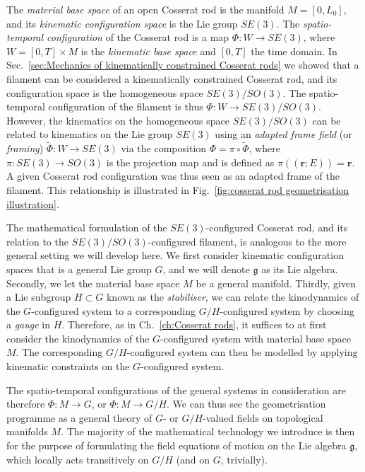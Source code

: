 The \textit{material base space} of an open Cosserat rod is the manifold $M = [0, L_0]$, and its \textit{kinematic configuration space} is the Lie group $SE(3)$. The \textit{spatio-temporal configuration} of the Cosserat rod is a map $\Phi : W \to SE(3)$, where $W = [0,T] \times M$ is the \textit{kinematic base space} and $[0,T]$ the time domain. In Sec.~\ref{sec:Mechanics of kinematically constrained Cosserat rods} we showed that a filament can be considered a kinematically constrained Cosserat rod, and its configuration space is the homogeneous space $SE(3)/SO(3)$. The spatio-temporal configuration of the filament is thus $\Phi : W \to SE(3) / SO(3)$. However, the kinematics on the homogeneous space $SE(3) / SO(3)$ can be related to kinematics on the Lie group $SE(3)$ using an \textit{adapted frame field} (or \textit{framing}) $\tilde{\Phi} : W \to SE(3)$ via the composition $\Phi = \pi \circ \tilde{\Phi}$, where $\pi : SE(3) \to SO(3)$ is the projection map and is defined as $\pi((\mathbf{r} ; E)) = \mathbf{r}$. A given Cosserat rod configuration was thus seen as an adapted frame of the filament. This relationship is illustrated in Fig.~\ref{fig:cosserat rod geometrisation illustration}.

The mathematical formulation of the $SE(3)$-configured Cosserat rod, and its relation to the $SE(3)/SO(3)$-configured filament, is analogous to the more general setting we will develop here. We first consider kinematic configuration spaces that is a general Lie group $G$, and we will denote $\mathfrak{g}$ as its Lie algebra. Secondly, we let the material base space $M$ be a general manifold. Thirdly, given a Lie subgroup $H \subset G$ known as the \textit{stabiliser}, we can relate the kinodynamics of the $G$-configured system to a corresponding $G/H$-configured system by choosing a \textit{gauge} in $H$. Therefore, as in Ch.~\ref{ch:Cosserat rods}, it suffices to at first consider the kinodynamics of the $G$-configured system with material base space $M$. The corresponding $G/H$-configured system can then be modelled by applying kinematic constraints on the $G$-configured system.

The spatio-temporal configurations of the general systems in consideration are therefore $\Phi : M \to G$, or $\Phi : M \to G/H$. We can thus see the geometrisation programme as a general theory of $G$- or $G/H$-valued fields on topological manifolds $M$. The majority of the mathematical technology we introduce is then for the purpose of formulating the field equations of motion on the Lie algebra $\mathfrak{g}$, which locally acts transitively on $G/H$ (and on $G$, trivially).


